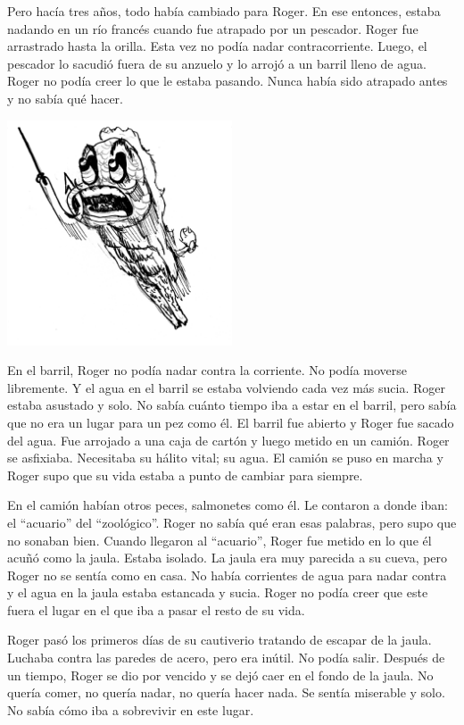 \documentclass[letterpaper,11pt]{report}
\begin{document}
Pero hacía tres años, todo había cambiado para Roger. En ese entonces, estaba nadando en un río francés cuando fue atrapado por un pescador. Roger fue arrastrado hasta la orilla. Esta vez no podía nadar contracorriente. Luego, el pescador lo sacudió fuera de su anzuelo y lo arrojó a un barril lleno de agua. Roger no podía creer lo que le estaba pasando. Nunca había sido atrapado antes y no sabía qué hacer.

\begin{center}
    \includegraphics[width=0.5\textwidth]{2}
\end{center}

En el barril, Roger no podía nadar contra la corriente. No podía moverse libremente. Y el agua en el barril se estaba volviendo cada vez más sucia. Roger estaba asustado y solo. No sabía cuánto tiempo iba a estar en el barril, pero sabía que no era un lugar para un pez como él. El barril fue abierto y Roger fue sacado del agua. Fue arrojado a una caja de cartón y luego metido en un camión. Roger se asfixiaba. Necesitaba su hálito vital; su agua. El camión se puso en marcha y Roger supo que su vida estaba a punto de cambiar para siempre.

En el camión habían otros peces, salmonetes como él. Le contaron a donde iban: el “acuario” del “zoológico”. Roger no sabía qué eran esas palabras, pero supo que no sonaban bien. Cuando llegaron al “acuario”, Roger fue metido en lo que él acuñó como la jaula. Estaba isolado. La jaula era muy parecida a su cueva, pero Roger no se sentía como en casa. No había corrientes de agua para nadar contra y el agua en la jaula estaba estancada y sucia. Roger no podía creer que este fuera el lugar en el que iba a pasar el resto de su vida.

Roger pasó los primeros días de su cautiverio tratando de escapar de la jaula. Luchaba contra las paredes de acero, pero era inútil. No podía salir. Después de un tiempo, Roger se dio por vencido y se dejó caer en el fondo de la jaula. No quería comer, no quería nadar, no quería hacer nada. Se sentía miserable y solo. No sabía cómo iba a sobrevivir en este lugar.
\end{document}
